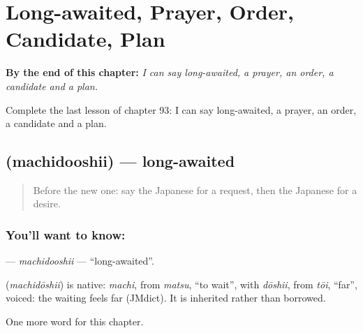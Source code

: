 
\chapter{Long-awaited, Prayer, Order, Candidate, Plan}
\label{ch:ja-long-awaited-prayer-order-candidate-plan}

\begin{chapteropening}
\textbf{By the end of this chapter:} \emph{I can say long-awaited, a prayer, an order, a candidate and a plan.}

Complete the last lesson of chapter 93: I can say long-awaited, a prayer, an order, a candidate and a plan.
\end{chapteropening}

\section[\texorpdfstring{\ja{まちどおしい} (machidooshii)}{まちどおしい (machidooshii)}]{ (machidooshii) — long-awaited}

\label{lesson:JA-C93-machidooshii}



\begin{quote}
Before the new one: say the Japanese for a request, then the Japanese for a desire.
\end{quote}

\subsection*{You'll want to know: }
\textbf{} — \emph{machidooshii} — \textquotedblleft{}long-awaited\textquotedblright{}.

\begin{cousinweb}
\textbf{} (\emph{machidōshii}) is native: \emph{machi}, from \emph{matsu}, \textquotedblleft{}to wait\textquotedblright{}, with \emph{dōshii}, from \emph{tōi}, \textquotedblleft{}far\textquotedblright{}, voiced: the waiting feels far (JMdict). It is inherited rather than borrowed.
\end{cousinweb}

\begin{grammarlens}[title={What you've built}]
One more word for this chapter.
\end{grammarlens}

